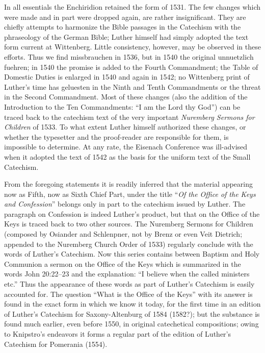 In all essentials the Enchiridion retained the form of 1531. The few changes which were made and in part were dropped again, are rather insignificant. They are chiefly attempts to harmonize the Bible passages in the Catechism with the phraseology of the German Bible; Luther himself had simply adopted the text form current at Wittenberg. Little consistency, however, may be observed in these efforts. Thus we find missbrauchen in 1536, but in 1540 the original unnuetzlich fuehren; in 1540 the promise is added to the Fourth Commandment; the Table of Domestic Duties is enlarged in 1540 and again in 1542; no Wittenberg print of Luther’s time has geluesten in the Ninth and Tenth Commandments or the threat in the Second Commandment. Most of these changes (also the addition of the Introduction to the Ten Commandments: “I am the Lord thy God”) can be traced back to the catechism text of the very important \emph{Nuremberg Sermons for Children} of 1533. To what extent Luther himself authorized these changes, or whether the typesetter and the proof-reader are responsible for them, is impossible to determine. At any rate, the Eisenach Conference was ill-advised when it adopted the text of 1542 as the basis for the uniform text of the Small Catechism.

From the foregoing statements it is readily inferred that the material appearing now as Fifth, now as Sixth Chief Part, under the title “\emph{Of the Office of the Keys and Confession}” belongs only in
part to the catechism issued by Luther. The paragraph on Confession is indeed Luther’s product, but that on the Office of the Keys is traced back to two other sources. The Nuremberg Sermons for Children (composed by Osiander and Schlenpner, not by Brenz or even Veit Dietrich; appended to the Nuremberg Church Order of 1533) regularly conclude with the words of Luther’s Catechism. Now this series contains between Baptism and Holy Communion a sermon on the Office of the Keys which is summarized in the words John 20:22–23 and the explanation: “I believe when the called ministers etc.” Thus the appearance of these words as part of Luther’s Catechism is easily accounted for. The question “What is the Office of the Keys” with its answer is found in the exact form in which we know it today, for the first time in an edition of Luther’s Catechism for Saxony-Altenburg of 1584 (1582?); but the substance is found much earlier, even before 1550, in original catechetical compositions; owing to Knipstro’s endeavors it forms a regular part of the edition of Luther’s Catechism for Pomerania (1554).

